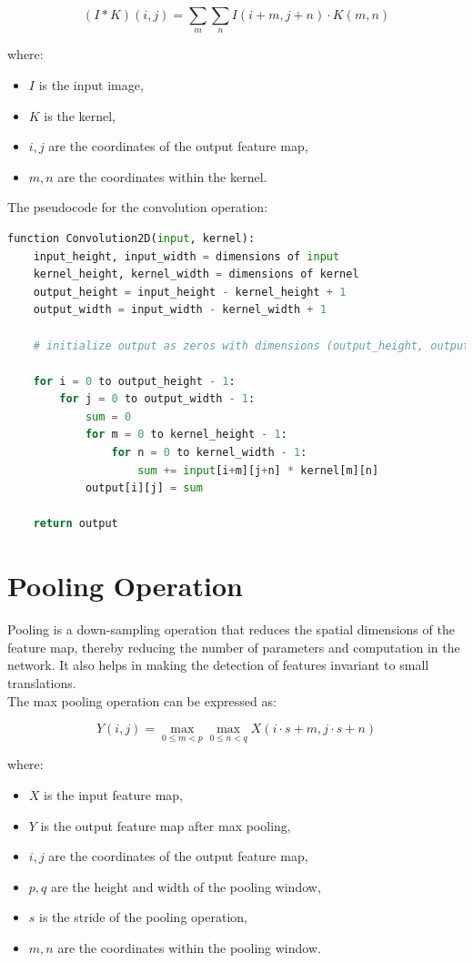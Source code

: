 \begin{equation}
(I * K)(i, j) = \sum_{m} \sum_{n} I(i + m, j + n) \cdot K(m, n)
\end{equation}

where:
\begin{itemize}
  \item $I$ is the input image,
  \item $K$ is the kernel,
  \item $i, j$ are the coordinates of the output feature map,
  \item $m, n$ are the coordinates within the kernel.
\end{itemize}

The  pseudocode for the convolution operation:

\begin{lstlisting}[language=Python, caption=Pseudocode for 2D Convolution Operation]
function Convolution2D(input, kernel):
    input_height, input_width = dimensions of input
    kernel_height, kernel_width = dimensions of kernel
    output_height = input_height - kernel_height + 1
    output_width = input_width - kernel_width + 1
    
    # initialize output as zeros with dimensions (output_height, output_width)
    
    for i = 0 to output_height - 1:
        for j = 0 to output_width - 1:
            sum = 0
            for m = 0 to kernel_height - 1:
                for n = 0 to kernel_width - 1:
                    sum += input[i+m][j+n] * kernel[m][n]
            output[i][j] = sum
    
    return output
\end{lstlisting}

\section{Pooling Operation}
Pooling is a down-sampling operation that reduces the spatial dimensions of the feature map, thereby reducing the number of parameters and computation in the network. It also helps in making the detection of features invariant to small translations.\\
The max pooling operation can be expressed as:

\begin{equation}
Y(i, j) = \max_{0 \leq m < p} \max_{0 \leq n < q} X(i \cdot s + m, j \cdot s + n)
\end{equation}

where:
\begin{itemize}
  \item $X$ is the input feature map,
  \item $Y$ is the output feature map after max pooling,
  \item $i, j$ are the coordinates of the output feature map,
  \item $p, q$ are the height and width of the pooling window,
  \item $s$ is the stride of the pooling operation,
  \item $m, n$ are the coordinates within the pooling window.
\end{itemize}

